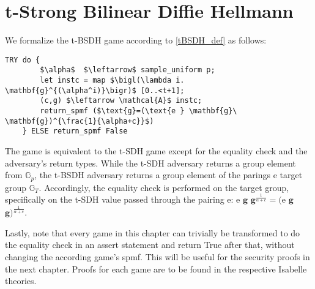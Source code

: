 \section*{t-Strong Bilinear Diffie Hellmann}
We formalize the t-BSDH game according to \ref{tBSDH_def} as follows: 
\begin{lstlisting}[language=isabelle]
    TRY do {
        $\alpha$  $\leftarrow$ sample_uniform p;
        let instc = map $\bigl(\lambda i. \mathbf{g}^{(\alpha^i)}\bigr)$ [0..<t+1];
        (c,g) $\leftarrow \mathcal{A}$ instc;
        return_spmf ($\text{g}=(\text{e } \mathbf{g}\ \mathbf{g})^{\frac{1}{\alpha+c}}$)
    } ELSE return_spmf False
\end{lstlisting}
The game is equivalent to the t-SDH game except for the equality check and the adversary's return types. 
While the t-SDH adversary returns a group element from $\mathbb{G}_p$, the t-BSDH adversary returns a group element of the parings e target group $\mathbb{G}_T$. Accordingly, the equality check is performed on the target group, specifically on the t-SDH value passed through the pairing e: e $\mathbf{g}$ $\mathbf{g}^{\frac{1}{\alpha+c}} = \text{(e}$ $\mathbf{g}$ $\mathbf{g})^{\frac{1}{\alpha+c}}$.

Lastly, note that every game in this chapter can trivially be transformed to do the equality check in an assert statement and return True after that, without changing the according game's spmf. This will be useful for the security proofs in the next chapter. Proofs for each game are to be found in the respective Isabelle theories.